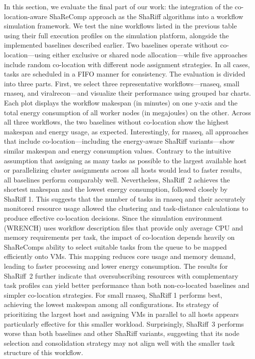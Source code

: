 In this section, we evaluate the final part of our work: the integration of the co-location-aware ShaReComp approach as the ShaRiff algorithms into a workflow simulation framework. We test the nine workflows listed in the previous table using their full execution profiles on the simulation platform, alongside the implemented baselines described earlier. Two baselines operate without co-location—using either exclusive or shared node allocation—while five approaches include random co-location with different node assignment strategies. In all cases, tasks are scheduled in a FIFO manner for consistency.
The evaluation is divided into three parts. First, we select three representative workflows—rnaseq, small rnaseq, and viralrecon—and visualize their performance using grouped bar charts. Each plot displays the workflow makespan (in minutes) on one y-axis and the total energy consumption of all worker nodes (in megajoules) on the other.
Across all three workflows, the two baselines without co-location show the highest makespan and energy usage, as expected. Interestingly, for rnaseq, all approaches that include co-location—including the energy-aware ShaRiff variants—show similar makespan and energy consumption values. Contrary to the intuitive assumption that assigning as many tasks as possible to the largest available host or parallelizing cluster assignments across all hosts would lead to faster results, all baselines perform comparably well. Nevertheless, ShaRiff~2 achieves the shortest makespan and the lowest energy consumption, followed closely by ShaRiff 1. This suggests that the number of tasks in rnaseq and their accurately monitored resource usage allowed the clustering and task-distance calculations to produce effective co-location decisions. Since the simulation environment (WRENCH) uses workflow description files that provide only average CPU and memory requirements per task, the impact of co-location depends heavily on ShaReComps ability to select suitable tasks from the queue to be mapped efficiently onto VMs. This mapping reduces core usage and memory demand, leading to faster processing and lower energy consumption. The results for ShaRiff~2 further indicate that oversubscribing resources with complementary task profiles can yield better performance than both non-co-located baselines and simpler co-location strategies.
For small rnaseq, ShaRiff 1 performs best, achieving the lowest makespan among all configurations. Its strategy of prioritizing the largest host and assigning VMs in parallel to all hosts appears particularly effective for this smaller workload. Surprisingly, ShaRiff~3 performs worse than both baselines and other ShaRiff variants, suggesting that its node selection and consolidation strategy may not align well with the smaller task structure of this workflow.

